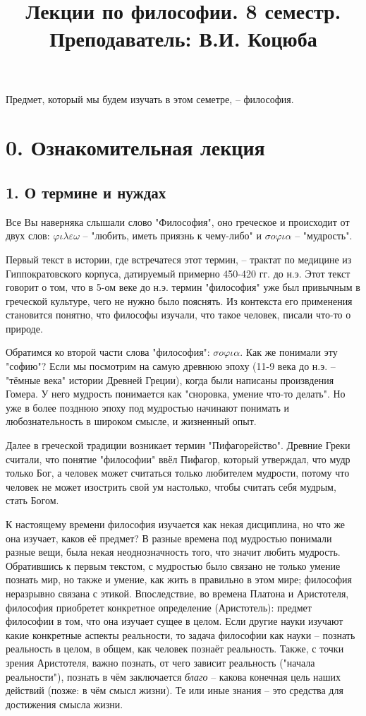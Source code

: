 \documentclass[a4paper, 12pt]{article} %
\title {Лекции по философии. 8 семестр. Преподаватель: В.И. Коцюба}
\begin{document}
\maketitle
\newpage

\tableofcontents
Предмет, который мы будем изучать в этом семетре, -- философия. 

\section*{0. Ознакомительная лекция}
\subsection*{1. О термине и нуждах}
Все Вы наверняка слышали слово "Философия", оно греческое и происходит от двух слов: $\varphi \iota \lambda \varepsilon \omega $ -- "любить, иметь приязнь к чему-либо" и
 $\sigma o \varphi \iota \alpha$ -- "мудрость".
 
Первый текст в истории, где встречатеся этот  термин, -- трактат по медицине из Гиппократовского корпуса, датируемый примерно 450-420 гг. до н.э. Этот текст говорит о том, что в 5-ом веке до н.э. термин "философия" уже был привычным в греческой культуре, чего не нужно было пояснять. Из контекста его применения становится понятно, что философы изучали, что такое человек, писали что-то о природе. 

Обратимся ко второй части слова "философия": $\sigma o \varphi \iota \alpha$. Как же понимали эту "софию"? Если мы посмотрим на самую древнюю эпоху (11-9 века до н.э. -- "тёмные века" истории Древней Греции), когда были написаны произвдения Гомера. У него мудрость понимается как "сноровка, умение что-то делать". Но уже в более позднюю эпоху под мудростью начинают понимать и любознательность в широком смысле, и жизненный опыт.

Далее в греческой традиции возникает термин "Пифагорейство". Древние Греки считали, что понятие "философии" ввёл Пифагор, который утверждал, что мудр только Бог, а человек может считаться только любителем мудрости, потому что человек не может изострить свой ум настолько, чтобы считать себя мудрым, стать Богом. 

К настоящему времени философия изучается как некая дисциплина, но что же она изучает, каков её предмет? В разные времена под мудростью понимали разные вещи, была некая неоднозначность того, что значит любить мудрость. Обратившись к первым текстом, с мудростью было связано не только умение познать мир, но также и умение, как жить в правильно в этом мире; философия неразрывно связана с этикой. Впоследствие, во времена Платона и Аристотеля, философия приобретет конкретное определение (Аристотель): предмет философии в том, что она изучает сущее в целом. Если другие науки изучают какие конкретные аспекты реальности, то задача философии как науки -- познать реальность в целом, в общем, как человек познаёт реальность. Также, с точки зрения Аристотеля, важно познать, от чего зависит реальность ("начала реальности"), познать в чём заключается \textit{благо} -- какова конечная цель наших действий (позже: в чём смысл жизни). Те или иные знания -- это средства для достижения смысла жизни. 
\end{document}
